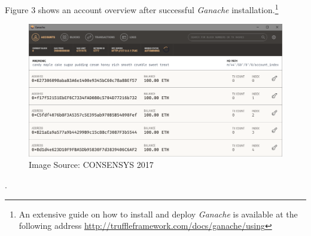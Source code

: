 \documentclass[submission,copyright,creativecommons]{eptcs}
\begin{document}
Figure 3 shows an account overview after successful \textit{Ganache} installation.\footnote{An extensive guide on how to install and deploy \textit{Ganache} is available at the following address \url{http://truffleframework.com/docs/ganache/using}}
\begin{figure}[h]
    \centering
    \label{fig:my_label}
    \includegraphics[width=5in]{ganache_accounts.png}
     \caption{Image Source: CONSENSYS 2017}
\end{figure}.



\newpage


\begin{multicols}{2}

\end{multicols}
\end{document}

